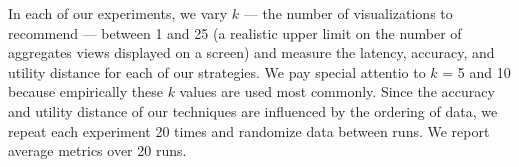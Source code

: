 In each of our experiments, we vary $k$ --- the number of visualizations to recommend --- between
1 and 25 (a realistic upper limit on the number of aggregates views displayed on a screen)
and measure the latency, accuracy, and utility distance for each of our
strategies. 
We pay special attentio to $k$ = 5 and 10 because empirically these $k$ values are used most commonly.
Since the accuracy and utility distance of our techniques are influenced by the
ordering of data, we repeat each experiment 20
times and randomize data between runs. We report average
metrics over 20 runs.









